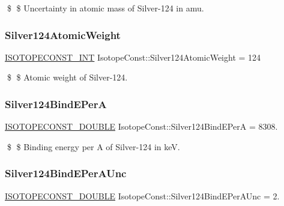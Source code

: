 \$ \$ Uncertainty in atomic mass of Silver-\/124 in amu. \mbox{\label{group___isotope_const-_silver-_ag124_ga241c74cff0bcfbf2928f5553a7f55ea0}} 
\subsubsection{\texorpdfstring{Silver124\+Atomic\+Weight}{Silver124AtomicWeight}}
{\footnotesize\ttfamily \mbox{\hyperlink{group___isotope_const-_macros_ga5f18360b3e99483a35c32d789e62621c}{I\+S\+O\+T\+O\+P\+E\+C\+O\+N\+S\+T\+\_\+\+I\+NT}} Isotope\+Const\+::\+Silver124\+Atomic\+Weight = 124}

\$ \$ Atomic weight of Silver-\/124. \mbox{\label{group___isotope_const-_silver-_ag124_ga771a56ddeb99f3c1b6146e8219cf5fee}} 
\subsubsection{\texorpdfstring{Silver124\+Bind\+E\+PerA}{Silver124BindEPerA}}
{\footnotesize\ttfamily \mbox{\hyperlink{group___isotope_const-_macros_ga8f45a7272ce02c0b4c65c44636ed719a}{I\+S\+O\+T\+O\+P\+E\+C\+O\+N\+S\+T\+\_\+\+D\+O\+U\+B\+LE}} Isotope\+Const\+::\+Silver124\+Bind\+E\+PerA = 8308.}

\$ \$ Binding energy per A of Silver-\/124 in keV. \mbox{\label{group___isotope_const-_silver-_ag124_gac21c4bb617c9de8d09e1ccfad01a969b}} 
\subsubsection{\texorpdfstring{Silver124\+Bind\+E\+Per\+A\+Unc}{Silver124BindEPerAUnc}}
{\footnotesize\ttfamily \mbox{\hyperlink{group___isotope_const-_macros_ga8f45a7272ce02c0b4c65c44636ed719a}{I\+S\+O\+T\+O\+P\+E\+C\+O\+N\+S\+T\+\_\+\+D\+O\+U\+B\+LE}} Isotope\+Const\+::\+Silver124\+Bind\+E\+Per\+A\+Unc = 2.}

